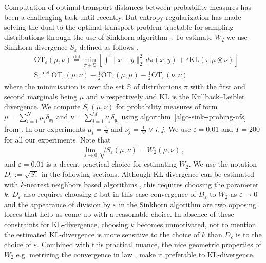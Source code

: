 Computation of optimal transport distances between probability measures has been a challenging task until recently. But entropy regularization has made solving the dual to the optimal transport problem tractable for sampling distributions through the use of Sinkhorn algorithm~\cite[and references therein]{genevay2019entropy}. To estimate $W_2$ we use Sinkhorn divergence $S_\varepsilon$ defined as follows \cite{feydy2019interpolating},
\begin{align}
    &\text{OT}_\varepsilon(\mu, \nu) \stackrel{\text{def}}{=} \min_{\pi \in \mathbb{S}}\left[\int\|x-y\|_2^2\,d\pi(x, y) + \varepsilon\text{KL}(\pi|\mu\otimes\nu)\right] \label{def-ot--probing-nfs}\\
    &\text{S}_\varepsilon \stackrel{\text{def}}{=} \text{OT}_\varepsilon(\mu, \nu) -\frac{1}{2}\text{OT}_\varepsilon(\mu, \mu)-\frac{1}{2}\text{OT}_\varepsilon(\nu, \nu) \label{def-sink--probing-nfs}
\end{align}
where the minimisation is over the set $\mathbb{S}$ of distributions $\pi$ with the first and second marginals being $\mu$ and $\nu$ respectively  
and $\text{KL}$ is the Kullback–Leibler divergence. We compute $S_\varepsilon(\mu, \nu)$ for probability measures of form $\mu=\sum_{i=1}^N\mu_i\delta_{x_i}$ and $\nu=\sum_{j=1}^M\nu_j\delta_{y_j}$ using algorithm~\ref{algo-sink--probing-nfs} from \cite{feydy2019interpolating}.
In our experiments $\mu_i=\frac{1}{N}$ and $\nu_j=\frac{1}{M}\; \forall\;i,j$. We use $\varepsilon=0.01$ and $T=200$ for all our experiments. { Note that \cite{genevay2019entropy, carlier2017convergence} 
\begin{equation}
    \lim_{\varepsilon\to0}\sqrt{S_\varepsilon(\mu, \nu)}= W_2(\mu, \nu) \,, \label{approx-w2--probing-nfs}
\end{equation}}
and $\varepsilon=0.01$ is a decent practical choice for estimating $W_2$. We use the notation $D_\varepsilon := \sqrt{S_\varepsilon}$ in the following sections. 
{
Although KL-divergence can be estimated with $k$-nearest neighbors based algorithms \cite{wang2009divergence}, this requires choosing the parameter $k$. $D_\varepsilon$ also requires choosing $\varepsilon$ but in this case convergence of $D_\varepsilon$ to $W_2$ as $\varepsilon\to 0$ and the appearance of division by $\varepsilon$ in the Sinkhorn algorithm are two opposing forces that help us come up with a reasonable choice. In absence of these constraints for KL-divergence, choosing $k$ becomes unmotivated, not to mention the estimated KL-divergence is more sensitive to the choice of $k$ than $D_\varepsilon$ is to the choice of $\varepsilon$. Combined with this practical nuance, the nice geometric  properties of $W_2$ e.g. metrizing the convergence in law \cite{feydy2019interpolating}, make it preferable to KL-divergence.}